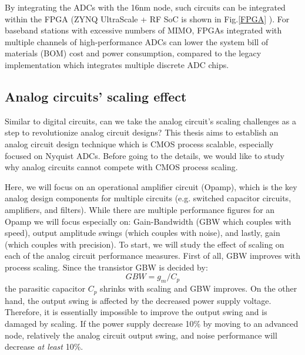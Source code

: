 By integrating the ADCs with the 16nm node, such circuits can be integrated within the FPGA (ZYNQ UltraScale + RF SoC is shown in Fig.\ref{FPGA} \cite{fpga}). 
For baseband stations with excessive numbers of MIMO, FPGAs integrated with multiple channels of high-performance ADCs can lower the system bill of materials (BOM) cost and power consumption, compared to the legacy implementation which integrates multiple discrete ADC chips.

\subsection{Analog circuits' scaling effect}
Similar to digital circuits, can we take the analog circuit's scaling challenges as a step to revolutionize analog circuit designs?
This thesis aims to establish an analog circuit design technique which is CMOS process scalable, especially focused on Nyquist ADCs.
Before going to the details, we would like to study why analog circuits cannot compete with CMOS process scaling.

Here, we will focus on an operational amplifier circuit (Opamp), which is the key analog design components for multiple circuits (e.g. switched capacitor circuits, amplifiers, and filters).
While there are multiple performance figures for an Opamp we will focus especially on: Gain-Bandwidth (GBW which couples with speed), output amplitude swings (which couples with noise), and lastly, gain (which couples with precision). To start, we will study the effect of scaling on each of the analog circuit performance measures.
First of all, GBW improves with process scaling. Since the transistor GBW is decided by: 
\begin{equation}
GBW = g_m / C_p
\end{equation}
the parasitic capacitor $C_p$ shrinks with scaling and GBW improves.
On the other hand, the output swing is affected by the decreased power supply voltage. 
Therefore, it is essentially impossible to improve the output swing and is damaged by scaling. If the power supply decrease 10\% by moving to an advanced node, relatively the analog circuit output swing, and noise performance will decrease \textit{at least} 10\%.

